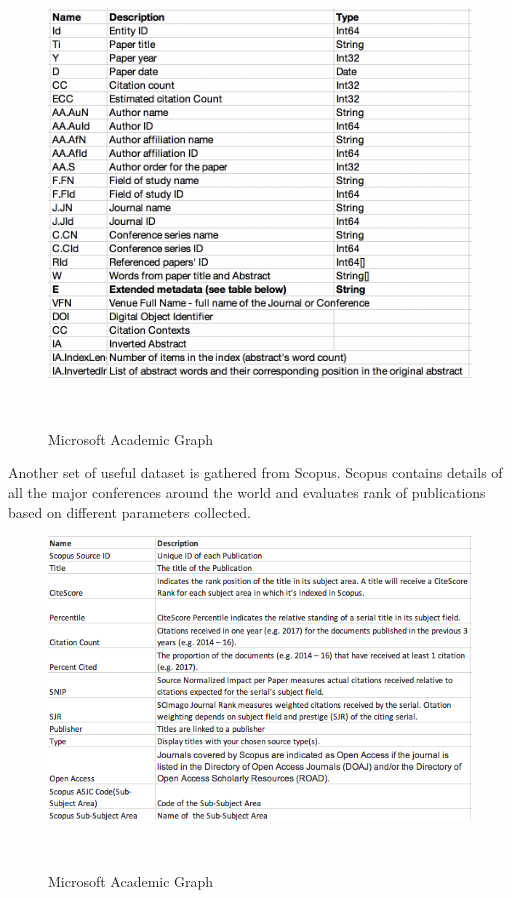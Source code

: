 \documentclass[a4paper, 11pt]{article}
\begin{document}
\begin{figure}[ht]
\centering
  \includegraphics[width=0.7\columnwidth]{MAG_data-info.png}
  \caption{Microsoft Academic Graph}~\label{fig: Microsoft Academic Graph}
\end{figure}
\FloatBarrier

Another set of useful dataset is gathered from Scopus. Scopus contains details of all the major conferences around the world and evaluates rank of publications based on different parameters collected.
\begin{figure}[ht]
\centering
  \includegraphics[width=0.7\columnwidth]{Scopus_data_info.png}
  \caption{Microsoft Academic Graph}~\label{fig: Microsoft Academic Graph}
\end{figure}
\FloatBarrier
\end{document}
